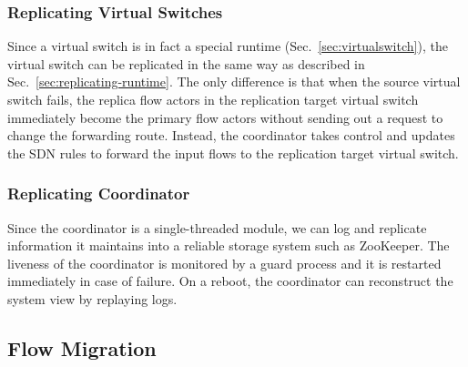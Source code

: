 \subsubsection{Replicating Virtual Switches}

Since a virtual switch is in fact a special runtime (Sec.~\ref{sec:virtualswitch}), the virtual switch can be replicated in the same way as described in Sec.~\ref{sec:replicating-runtime}. The only difference is that when the source virtual switch fails, the replica flow actors in the replication target virtual switch immediately become the primary flow actors without sending out a request to change the forwarding route. Instead, the coordinator takes control and updates the SDN rules to forward the input flows to the replication target virtual switch.

\subsubsection{Replicating Coordinator}

Since the coordinator is a single-threaded module, we can log and replicate information it maintains into a reliable storage system such as ZooKeeper\cite{hunt2010zookeeper}. The liveness of the coordinator is monitored by a guard process and it is restarted immediately in case of failure. On a reboot, the coordinator can reconstruct the system view by replaying logs.

\subsection{Flow Migration}
\label{sec:migration}

